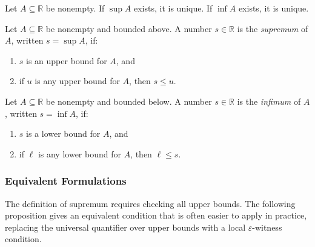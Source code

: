\begin{proposition}
\label{prop:sup-unique}
Let $A \subseteq \mathbb{R}$ be nonempty.
If $\sup A$ exists, it is unique. If $\inf A$ exists, it is unique.
\end{proposition}

\begin{tcolorbox}[colback=propbox, colframe=propborder, arc=2pt,
  left=6pt, right=6pt, top=4pt, bottom=4pt,
  title={\small\textbf{Definition (Supremum (Least Upper Bound))}},
  fonttitle=\small\bfseries]
Let $A \subseteq \mathbb{R}$ be nonempty and bounded above.
A number $s \in \mathbb{R}$ is the \emph{supremum} of $A$,
written $s = \sup A$, if:
\begin{enumerate}
  \item $s$ is an upper bound for $A$, and
  \item if $u$ is any upper bound for $A$, then $s \le u$.
\end{enumerate}
\end{tcolorbox}

\begin{tcolorbox}[colback=propbox, colframe=propborder, arc=2pt,
  left=6pt, right=6pt, top=4pt, bottom=4pt,
  title={\small\textbf{Definition (Infimum (Greatest Lower Bound))}},
  fonttitle=\small\bfseries]
Let $A \subseteq \mathbb{R}$ be nonempty and bounded below.
A number $s \in \mathbb{R}$ is the \emph{infimum} of $A$,
written $s = \inf A$, if:
\begin{enumerate}
  \item $s$ is a lower bound for $A$, and
  \item if $\ell$ is any lower bound for $A$, then $\ell \le s$.
\end{enumerate}
\end{tcolorbox}


\subsubsection{Equivalent Formulations}

The definition of supremum requires checking all upper bounds. The
following proposition gives an equivalent condition that is often easier
to apply in practice, replacing the universal quantifier over upper bounds
with a local $\varepsilon$-witness condition.

